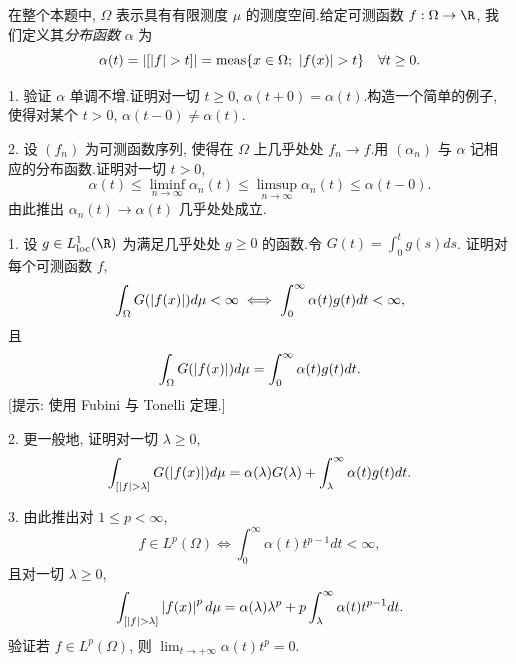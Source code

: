 \begin{problem}
\label{prob:21}
在整个本题中, $\Omega$ 表示具有有限测度 $\mu$ 的测度空间.给定可测函数
$f:\Omega\to\R$, 我们定义其\emph{分布函数} $\alpha$ 为
\begin{equation*}
\alpha(t)=\abs{[\abs{f}>t]}=\operatorname{meas}\{x\in\Omega;\ \abs{f(x)}>t\}\quad\forall t\ge0.
\end{equation*}


1. 验证 $\alpha$ 单调不增.证明对一切 $t\ge0$, $\alpha(t+0)=\alpha(t)$.构造一个简单的例子,
使得对某个 $t>0$, $\alpha(t-0)\ne\alpha(t)$.

2. 设 $(f_n)$ 为可测函数序列, 使得在 $\Omega$ 上几乎处处 $f_n\to f$.用 $(\alpha_n)$ 与
$\alpha$ 记相应的分布函数.证明对一切 $t>0$,
\begin{equation*}
\alpha(t)\le\liminf_{n\to\infty}\alpha_n(t)\le\limsup_{n\to\infty}\alpha_n(t)\le\alpha(t-0).
\end{equation*}
由此推出 $\alpha_n(t)\to\alpha(t)$ 几乎处处成立.


1. 设 $g\in L^1_{\text{loc}}(\R)$ 为满足几乎处处 $g\ge0$ 的函数.令 $G(t)=\int_0^tg(s)ds$.
证明对每个可测函数 $f$,
\begin{equation*}
\int_\Omega G(\left|f(x)\right|)d\mu<\infty\iff\int_0^\infty\alpha(t)g(t)dt<\infty,
\end{equation*}
且
\begin{equation*}
\int_\Omega G(\left|f(x)\right|)d\mu=\int_0^\infty\alpha(t)g(t)dt.
\end{equation*}
[提示: 使用 Fubini 与 Tonelli 定理.]

2. 更一般地, 证明对一切 $\lambda\ge0$,
\begin{equation*}
\int_{[\abs{f}>\lambda]}G(\abs{f(x)})d\mu=\alpha(\lambda)G(\lambda)+\int_\lambda^\infty\alpha(t)g(t)dt.
\end{equation*}

3. 由此推出对 $1\le p<\infty$,
\begin{equation*}
f\in L^p(\Omega)\iff\int_0^\infty\alpha(t)t^{p-1}dt<\infty,
\end{equation*}
且对一切 $\lambda\ge0$,
\begin{equation*}
\int_{[\abs{f}>\lambda]}\abs{f(x)}^pd\mu=\alpha(\lambda)\lambda^p+p\int_\lambda^\infty\alpha(t)t^{p-1}dt.
\end{equation*}
验证若 $f\in L^p(\Omega)$, 则 $\lim_{t\to+\infty}\alpha(t)t^p=0$.


\end{problem}

